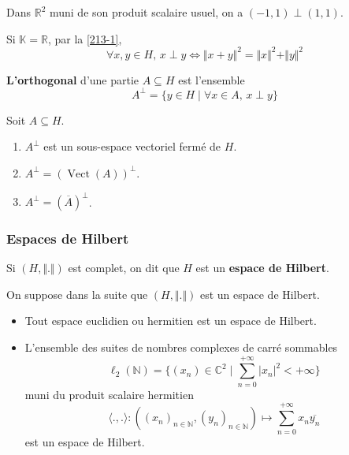   \begin{example}
    Dans $\mathbb{R}^2$ muni de son produit scalaire usuel, on a $(-1,1) \perp (1,1)$.
  \end{example}

  \begin{remark}
    Si $\mathbb{K} = \mathbb{R}$, par la \cref{213-1},
    \[ \forall x, y \in H, \, x \perp y \iff \Vert x + y \Vert^2 = \Vert x \Vert^2 + \Vert y \Vert^2 \]
  \end{remark}

  \begin{definition}
    \textbf{L'orthogonal} d'une partie $A \subseteq H$ est l'ensemble
    \[ A^\perp = \{ y \in H \mid \forall x \in A, \, x \perp y \} \]
  \end{definition}


  \begin{proposition}
    Soit $A \subseteq H$.
    \begin{enumerate}[label={\bfseries(\roman*)}]
      \item $A^\perp$ est un sous-espace vectoriel fermé de $H$.
      \item $A^\perp = (\operatorname{Vect}(A))^\perp$.
      \item $A^\perp = (\overline{A})^\perp$.
    \end{enumerate}
  \end{proposition}

  \subsubsection{Espaces de Hilbert}


  \begin{definition}
    Si $(H, \Vert . \Vert)$ est complet, on dit que $H$ est un \textbf{espace de Hilbert}.
  \end{definition}

  On suppose dans la suite que $(H, \Vert . \Vert)$ est un espace de Hilbert.

  \begin{example}
    \begin{itemize}
      \item Tout espace euclidien ou hermitien est un espace de Hilbert.
      \item L'ensemble des suites de nombres complexes de carré sommables
      \[ \ell_2(\mathbb{N}) = \{ (x_n) \in \mathbb{C}^2 \mid \sum_{n=0}^{+\infty} \vert x_n \vert^2 < +\infty \} \]
      muni du produit scalaire hermitien
      \[ \langle ., . \rangle : ((x_n)_{n \in \mathbb{N}},(y_n)_{n \in \mathbb{N}}) \mapsto \sum_{n=0}^{+\infty} x_n \overline{y_n} \]
      est un espace de Hilbert.
    \end{itemize}
  \end{example}

